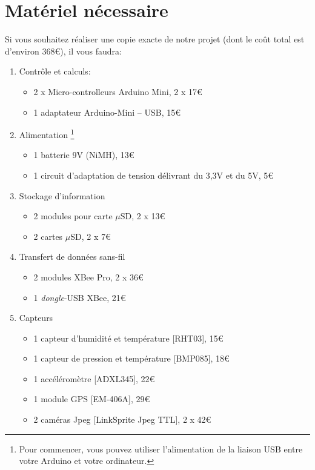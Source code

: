 \documentclass[twocolumn, 8pt]{article}
\begin{document}
\section{Matériel nécessaire}
Si vous souhaitez réaliser une copie exacte de notre projet (dont le coût total est d'environ 368\euro), il vous faudra:
\begin{enumerate}
	\item Contrôle et calculs:
		\begin{itemize}
			\item 2 x Micro-controlleurs Arduino Mini, 2 x 17\euro
			\item 1 adaptateur Arduino-Mini -- USB, 15\euro
		\end{itemize}
	\item Alimentation \footnote{Pour commencer, vous pouvez utiliser l'alimentation de la liaison USB entre votre Arduino et votre ordinateur.}
		\begin{itemize}
			\item 1 batterie 9V (NiMH), 13\euro
			\item 1 circuit d'adaptation de tension délivrant du 3,3V et du 5V, 5\euro
		\end{itemize}
	\item Stockage d'information
		\begin{itemize}
			\item 2 modules pour carte $\mu$SD, 2 x 13\euro
			\item 2 cartes $\mu$SD, 2 x 7\euro
		\end{itemize}
	\item Transfert de données sans-fil
		\begin{itemize}
			\item 2 modules XBee Pro, 2 x 36\euro 
			\item 1 \textit{dongle}-USB XBee, 21\euro
		\end{itemize}
	\item Capteurs
		\begin{itemize}
			\item 1 capteur d'humidité et température [RHT03], 15\euro
			\item 1 capteur de pression et température [BMP085], 18\euro
			\item 1 accéléromètre [ADXL345], 22\euro
			\item 1 module GPS [EM-406A], 29\euro 
			\item 2 caméras Jpeg [LinkSprite Jpeg TTL], 2 x 42\euro
		\end{itemize}
\end{enumerate}
\end{document}
